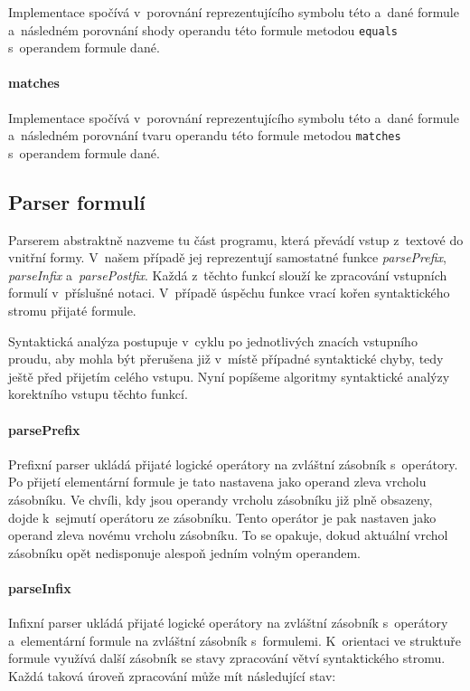 \documentclass[thesis=B,czech,hidelinks]{thesis}[2012/06/26]
\begin{document}
Implementace spočívá v~porovnání reprezentujícího symbolu této a~dané formule a~následném porovnání shody operandu této formule metodou \texttt{equals} s~operandem formule dané.

\paragraph{matches}

Implementace spočívá v~porovnání reprezentujícího symbolu této a~dané formule a~následném porovnání tvaru operandu této formule metodou \texttt{matches} s~operandem formule dané.

\subsection{Parser formulí}

Parserem abstraktně nazveme tu část programu, která převádí vstup z~textové do vnitřní formy. V~našem případě jej reprezentují samostatné funkce \emph{parsePrefix}, \emph{parseInfix} a~\emph{parsePostfix}. Každá z~těchto funkcí slouží ke zpracování vstupních formulí v~příslušné notaci. V~případě úspěchu funkce vrací kořen syntaktického stromu přijaté formule.

Syntaktická analýza postupuje v~cyklu po jednotlivých znacích vstupního proudu, aby mohla být přerušena již v~místě případné syntaktické chyby, tedy ještě před přijetím celého vstupu. Nyní popíšeme algoritmy syntaktické analýzy korektního vstupu těchto funkcí.

\paragraph{parsePrefix}

Prefixní parser ukládá přijaté logické operátory na zvláštní zásobník s~operátory. Po přijetí elementární formule je tato nastavena jako operand zleva vrcholu zásobníku. Ve chvíli, kdy jsou operandy vrcholu zásobníku již plně obsazeny, dojde k~sejmutí operátoru ze zásobníku. Tento operátor je pak nastaven jako operand zleva novému vrcholu zásobníku. To se opakuje, dokud aktuální vrchol zásobníku opět nedisponuje alespoň jedním volným operandem.

\paragraph{parseInfix}

Infixní parser ukládá přijaté logické operátory na zvláštní zásobník s~operátory a~elementární formule na zvláštní zásobník s~formulemi. K~orientaci ve struktuře formule využívá další zásobník se stavy zpracování větví syntaktického stromu. Každá taková úroveň zpracování může mít následující stav:
\end{document}
